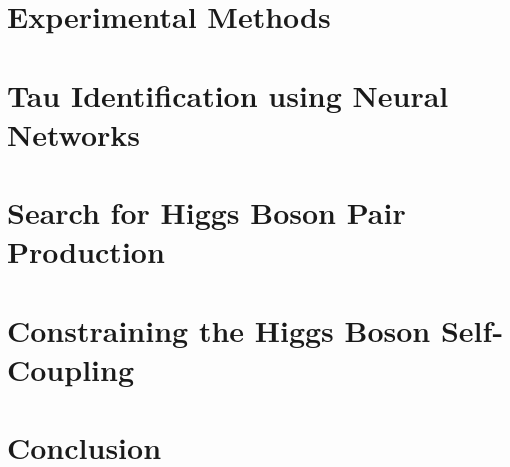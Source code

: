 \documentclass[PhD, UKenglish]{scrbook}
\begin{document}
\chapter{Experimental Methods}
\label{sec:experimental_methods}



\chapter{Tau Identification using Neural Networks}
\label{sec:tauid}



\chapter{Search for Higgs Boson Pair Production}
\label{sec:dihiggs}










\chapter{Constraining the Higgs Boson Self-Coupling}
\label{sec:higgs_self_coupling}




\chapter{Conclusion}
\label{sec:conclusion}

\end{document}
